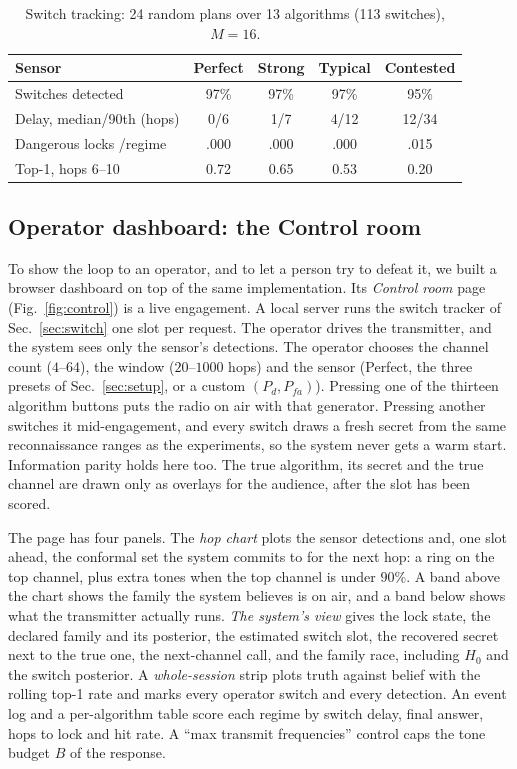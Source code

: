 \documentclass[conference]{IEEEtran}
\begin{document}
\begin{table}[t]
\centering
\caption{Switch tracking: 24 random plans over 13 algorithms (113 switches),
$M=16$.}
\label{tab:switch}
\setlength{\tabcolsep}{3pt}
\footnotesize
\begin{tabular}{@{}lcccc@{}}
\toprule
Sensor & Perfect & Strong & Typical & Contested \\
\midrule
Switches detected        & 97\% & 97\% & 97\% & 95\% \\
Delay, median/90th (hops)& 0/6  & 1/7  & 4/12 & 12/34 \\
Dangerous locks /regime  & .000 & .000 & .000 & .015 \\
Top-1, hops 6--10        & 0.72 & 0.65 & 0.53 & 0.20 \\
\bottomrule
\end{tabular}
\end{table}

\subsection{Operator dashboard: the Control room}
\label{sec:dashboard}
To show the loop to an operator, and to let a person try to defeat it, we built
a browser dashboard on top of the same implementation. Its \emph{Control room}
page (Fig.~\ref{fig:control}) is a live engagement. A local server runs the
switch tracker of Sec.~\ref{sec:switch} one slot per request. The operator
drives the transmitter, and the system sees only the sensor's detections. The
operator chooses the channel count ($4$--$64$), the window ($20$--$1000$ hops)
and the sensor (Perfect, the three presets of Sec.~\ref{sec:setup}, or a custom
$(P_d,P_{fa})$). Pressing one of the thirteen algorithm buttons puts the radio
on air with that generator. Pressing another switches it mid-engagement, and
every switch draws a fresh secret from the same reconnaissance ranges as the
experiments, so the system never gets a warm start. Information parity holds
here too. The true algorithm, its secret and the true channel are drawn only
as overlays for the audience, after the slot has been scored.

The page has four panels. The \emph{hop chart} plots the sensor detections and,
one slot ahead, the conformal set the system commits to for the next hop: a
ring on the top channel, plus extra tones when the top channel is under $90\%$.
A band above the chart shows the family the system believes is on air, and a
band below shows what the transmitter actually runs. \emph{The system's view}
gives the lock state, the declared family and its posterior, the estimated
switch slot, the recovered secret next to the true one, the next-channel call,
and the family race, including $H_0$ and the switch posterior. A
\emph{whole-session} strip plots truth against belief with the rolling top-1
rate and marks every operator switch and every detection. An event log and a
per-algorithm table score each regime by switch delay, final answer, hops to
lock and hit rate. A ``max transmit frequencies'' control caps the tone budget
$B$ of the response.
\end{document}
